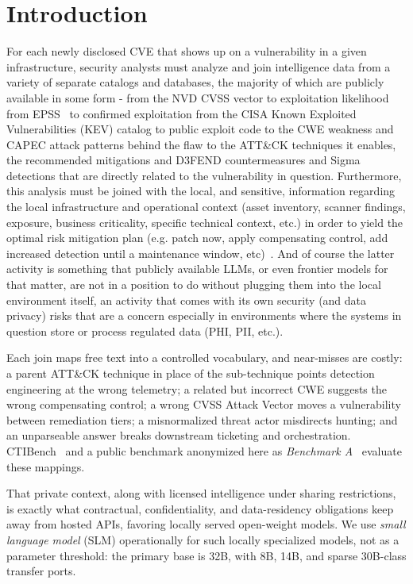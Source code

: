 \documentclass[conference]{IEEEtran}
\begin{document}
\section{Introduction}
For each newly disclosed CVE that shows up on a vulnerability in a given infrastructure, security analysts must analyze and join intelligence data from a variety of separate catalogs and databases, the majority of which are publicly available in some form - from the NVD CVSS vector to exploitation likelihood from EPSS~\cite{jacobs2021epss} to confirmed exploitation from the CISA Known Exploited Vulnerabilities (KEV) catalog to public exploit code to the CWE weakness and CAPEC attack patterns behind the flaw to the ATT\&CK techniques it enables, the recommended mitigations and D3FEND countermeasures and Sigma detections that are directly related to the vulnerability in question. Furthermore, this analysis must be joined with the local, and sensitive, information regarding the local infrastructure and operational context (asset inventory, scanner findings, exposure, business criticality, specific technical context, etc.) in order to yield the optimal risk mitigation plan (e.g. patch now, apply compensating control, add increased detection until a maintenance window, etc)~\cite{nist80040r4}. And of course the latter activity is something that publicly available LLMs, or even frontier models for that matter, are not in a position to do without plugging them into the local environment itself, an activity that comes with its own security (and data privacy) risks that are a concern especially in environments where the systems in question store or process regulated data (PHI, PII, etc.). 

Each join maps free text into a controlled vocabulary, and near-misses are costly: a parent ATT\&CK technique in place of the sub-technique points detection engineering at the wrong telemetry; a related but incorrect CWE suggests the wrong compensating control; a wrong CVSS Attack Vector moves a vulnerability between remediation tiers; a misnormalized threat actor misdirects hunting; and an unparseable answer breaks downstream ticketing and orchestration. CTIBench~\cite{ctibench} and a public benchmark anonymized here as \emph{Benchmark A}~\cite{anonbench} evaluate these mappings.

That private context, along with licensed intelligence under sharing restrictions, is exactly what contractual, confidentiality, and data-residency obligations keep away from hosted APIs, favoring locally served open-weight models. We use \emph{small language model} (SLM) operationally for such locally specialized models, not as a parameter threshold: the primary base is 32B, with 8B, 14B, and sparse 30B-class transfer ports.
\end{document}
